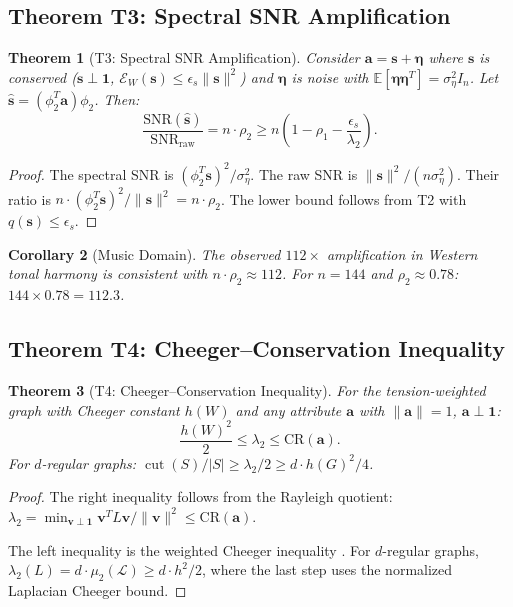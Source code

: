\documentclass[12pt,letterpaper]{article}
\newtheorem{theorem}{Theorem}[section]
\newtheorem{corollary}[theorem]{Corollary}
\newcommand{\E}{\mathbb{E}}
\newcommand{\One}{\mathbf{1}}
\newcommand{\bfa}{\mathbf{a}}
\newcommand{\bfv}{\mathbf{v}}
\newcommand{\bfs}{\mathbf{s}}
\newcommand{\CR}{\mathrm{CR}}
\newcommand{\cut}{\operatorname{cut}}
\newcommand{\cE}{\mathcal{E}}
\begin{document}
\subsection{Theorem T3: Spectral SNR Amplification}

\begin{theorem}[T3: Spectral SNR Amplification]
\label{thm:T3}
Consider $\bfa = \bfs + \boldsymbol{\eta}$ where $\bfs$ is conserved ($\bfs \perp \One$, $\cE_W(\bfs) \leq \epsilon_s \|\bfs\|^2$) and $\boldsymbol{\eta}$ is noise with $\E[\boldsymbol{\eta}\boldsymbol{\eta}^T] = \sigma_\eta^2 I_n$. Let $\hat{\bfs} = (\phi_2^T \bfa)\phi_2$. Then:
\begin{equation}
\label{eq:T3}
  \frac{\mathrm{SNR}(\hat{\bfs})}{\mathrm{SNR}_{\mathrm{raw}}} = n \cdot \rho_2 \geq n\left(1 - \rho_1 - \frac{\epsilon_s}{\lambda_2}\right).
\end{equation}
\end{theorem}

\begin{proof}
The spectral SNR is $(\phi_2^T \bfs)^2/\sigma_\eta^2$. The raw SNR is $\|\bfs\|^2/(n\sigma_\eta^2)$. Their ratio is $n \cdot (\phi_2^T \bfs)^2/\|\bfs\|^2 = n \cdot \rho_2$. The lower bound follows from T2 with $q(\bfs) \leq \epsilon_s$.
\end{proof}

\begin{corollary}[Music Domain]
\label{cor:music}
The observed $112\times$ amplification in Western tonal harmony is consistent with $n \cdot \rho_2 \approx 112$. For $n = 144$ and $\rho_2 \approx 0.78$: $144 \times 0.78 = 112.3$.
\end{corollary}

\subsection{Theorem T4: Cheeger--Conservation Inequality}

\begin{theorem}[T4: Cheeger--Conservation Inequality]
\label{thm:T4}
For the tension-weighted graph with Cheeger constant $h(W)$ and any attribute $\bfa$ with $\|\bfa\| = 1$, $\bfa \perp \One$:
\begin{equation}
\label{eq:T4}
  \frac{h(W)^2}{2} \leq \lambda_2 \leq \CR(\bfa).
\end{equation}
For $d$-regular graphs: $\cut(S)/|S| \geq \lambda_2/2 \geq d \cdot h(G)^2/4$.
\end{theorem}

\begin{proof}
The right inequality follows from the Rayleigh quotient: $\lambda_2 = \min_{\bfv \perp \One} \bfv^T L \bfv / \|\bfv\|^2 \leq \CR(\bfa)$.

The left inequality is the weighted Cheeger inequality \citep{cheeger1970,chung1997}. For $d$-regular graphs, $\lambda_2(L) = d \cdot \mu_2(\mathcal{L}) \geq d \cdot h^2/2$, where the last step uses the normalized Laplacian Cheeger bound.
\end{proof}
\end{document}
